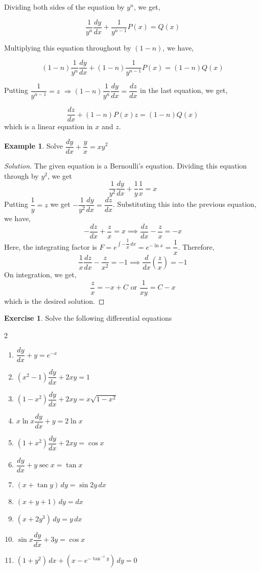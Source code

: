\documentclass{book}
\theoremstyle{definition}
\newtheorem{exercise}{Exercise}[section]
\newtheorem{example}{Example}[section]
\newenvironment{solution}
    {\begin{proof}[Solution]}
    {\end{proof}}
\begin{document}
Dividing both sides of the equation by $y^n$, we get,

\[
\frac{1}{y^n}\frac{dy}{dx}+\frac{1}{y^{n-1}}P(x)=Q(x)
\]

Multiplying this equation throughout by $(1-n)$, we have,

\[
(1-n)\frac{1}{y^n}\frac{dy}{dx}+(1-n)\frac{1}{y^{n-1}}P(x)=(1-n)Q(x)
\]

Putting $\dfrac{1}{y^{n-1}}=z$ $\Rightarrow (1-n)\dfrac{1}{y^n}\dfrac{dy}{dx}=\dfrac{dz}{dx}$ in the last equation, we get,

\[
\frac{dz}{dx}+(1-n)P(x)z=(1-n)Q(x)
\]
which is a linear equation in $x$ and $z$.

\begin{example}
Solve $\dfrac{dy}{dx}+\dfrac{y}{x}=xy^2$    
\end{example}

\begin{solution}
The given equation is a Bernoulli's equation. Dividing this equation through by $y^2$, we get
\[
\frac{1}{y^2}\frac{dy}{dx}+\frac{1}{y}\frac{1}{x}=x
\]
Putting $\dfrac{1}{y}=z$ we get $-\dfrac{1}{y^2}\dfrac{dy}{dx}=\dfrac{dz}{dx}$. Substituting this into the previous equation, we have,
\[
-\frac{dz}{dx}+\frac{z}{x}=x \implies \frac{dz}{dx}-\frac{z}{x}=-x
\]
Here, the integrating factor is $F=e^{\int -\dfrac{1}{x}\,dx}=e^{-\ln x}=\dfrac{1}{x}$. Therefore, 
\[
\frac{1}{x}\frac{dz}{dx}-\frac{z}{x^2}=-1 \implies \frac{d}{dx}\left(\frac{z}{x}\right)=-1
\]
On integration, we get, 
\[
\frac{z}{x}=-x+C \text{ or } \frac{1}{xy}=C-x
\]
which is the desired solution.
\end{solution}


\begin{exercise}
Solve the following differential equations
\begin{multicols}{2}
\begin{enumerate}[label=(\roman*)]
    \item $\dfrac{dy}{dx}+y=e^{-x}$
    \item $(x^2-1)\dfrac{dy}{dx}+2xy=1$
    \item $(1-x^2)\dfrac{dy}{dx}+2xy=x\sqrt{1-x^2}$
    \item $x\ln x\dfrac{dy}{dx}+y=2\ln x$
    \item $(1+x^2)\dfrac{dy}{dx}+2xy= \cos x$
    \item $\dfrac{dy}{dx}+y\sec x=\tan x$
    \item $(x+\tan y)\,dy=\sin 2y\,dx$
    \item $(x+y+1)\,dy=dx$
    \item $(x+2y^3)\,dy=y\,dx$
    \item $\sin x\dfrac{dy}{dx}+3y=\cos x$
    \item $(1+y^2)\,dx+(x-e^{-\tan^{-1}y})\,dy=0$

\end{enumerate}
\end{multicols}
\end{exercise}
\end{document}

